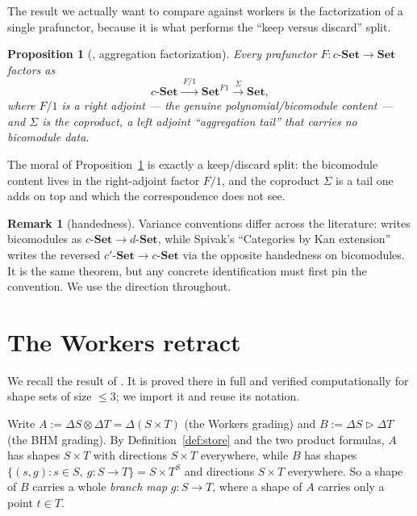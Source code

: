 \documentclass[11pt]{amsart}
\theoremstyle{plain}
\newtheorem{proposition}[theorem]{Proposition}
\theoremstyle{definition}
\newtheorem{remark}[theorem]{Remark}
\theoremstyle{gap}
\newcommand{\Set}{\mathbf{Set}}
\renewcommand{\lhd}{\vartriangleright}
\newcommand{\Store}[1]{\Delta #1}
\begin{document}
The result we actually want to compare against workers is the factorization of a
single prafunctor, because it is what performs the ``keep versus discard'' split.

\begin{proposition}[{\cite[Prop.~3.6]{SGF}}, aggregation factorization]\label{prop:factor}
Every prafunctor $F\colon c\text{-}\Set\to\Set$ factors as
\[
c\text{-}\Set \xrightarrow{\;F/1\;} \Set^{F1} \xrightarrow{\;\Sigma\;} \Set,
\]
where $F/1$ is a \emph{right adjoint} --- the genuine polynomial/bicomodule content
--- and $\Sigma$ is the coproduct, a \emph{left adjoint} ``aggregation tail'' that
carries no bicomodule data.
\end{proposition}

The moral of Proposition~\ref{prop:factor} is exactly a keep/discard split: the
bicomodule content lives in the right-adjoint factor $F/1$, and the coproduct
$\Sigma$ is a tail one adds on top and which the correspondence does not see.

\begin{remark}[handedness]\label{rem:handedness}
Variance conventions differ across the literature: \cite{SGF} writes bicomodules as
$c\text{-}\Set\to d\text{-}\Set$, while Spivak's ``Categories by Kan extension''
writes the reversed $c'\text{-}\Set\to c\text{-}\Set$ via the opposite handedness on
bicomodules. It is the same theorem, but any concrete identification must first pin
the convention. We use the \cite{SGF} direction throughout.
\end{remark}

\section{The Workers retract}\label{sec:workers}

We recall the result of \cite{workersProof}. It is proved there in full and verified
computationally for shape sets of size $\le 3$; we import it and reuse its notation.

Write $A:=\Store{S}\otimes\Store{T}=\Store{(S\times T)}$ (the Workers grading) and
$B:=\Store{S}\lhd\Store{T}$ (the BHM grading). By Definition~\ref{def:store} and the
two product formulas, $A$ has shapes $S\times T$ with directions $S\times T$
everywhere, while $B$ has shapes $\{(s,g):s\in S,\ g\colon S\to T\}=S\times T^{S}$ and
directions $S\times T$ everywhere. So a shape of $B$ carries a whole \emph{branch
map} $g\colon S\to T$, where a shape of $A$ carries only a point $t\in T$.
\end{document}
